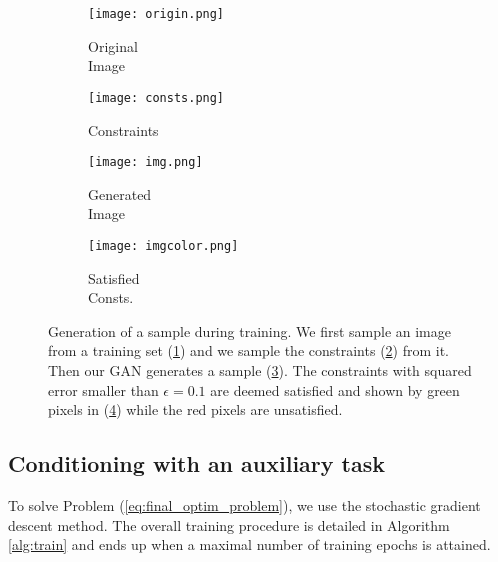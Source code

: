 \begin{figure}[t]
	\centering
	\begin{subfigure}[t]{0.25\textwidth}
		\centering
		\texttt{[image: origin.png]}
		\caption{Original\\Image}
		\label{fig:original_shoe}
	\end{subfigure}\begin{subfigure}[t]{0.25\textwidth}
		\centering
		\texttt{[image: consts.png]}
		\caption{Constraints}
		\label{fig:constraints}
	\end{subfigure}\begin{subfigure}[t]{0.25\textwidth}
		\centering
		\texttt{[image: img.png]}
		\caption{Generated\\Image}
		\label{fig:pixelwise}
	\end{subfigure}\begin{subfigure}[t]{0.24\textwidth}
		\centering
		\texttt{[image: imgcolor.png]}
		\caption{Satisfied\\Consts.}
		\label{fig:generated}
	\end{subfigure}
	\caption[Generation of a sample during training]{Generation of a sample during training. We first sample an image from a training set (\ref{fig:original_shoe}) and we sample the constraints (\ref{fig:constraints}) from it. Then our GAN generates a sample (\ref{fig:pixelwise}). The constraints with squared error smaller than $\epsilon=0.1$ are deemed satisfied and shown by green pixels in (\ref{fig:generated}) while the red pixels are unsatisfied.}
	\label{fig:image_completion}
\end{figure}

\subsection{Conditioning with an auxiliary task}

To solve Problem (\ref{eq:final_optim_problem}), we use the stochastic gradient descent method. The overall training procedure is detailed in Algorithm \ref{alg:train} and ends up when a maximal number of training epochs is attained. 


